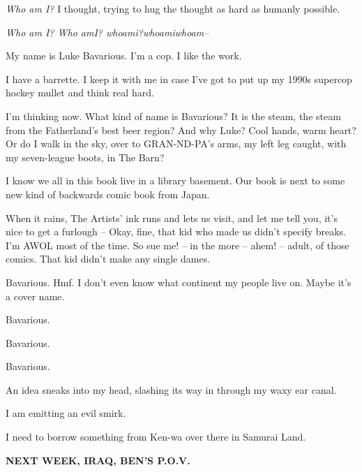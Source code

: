 {\em Who am I?} I thought, trying to hug the thought as hard as
humanly possible.



{\em Who am I? Who amI? whoami?whoamiwhoam--}





My name is Luke Bavarious. I'm a cop. I like the work.



I have a barrette. I keep it with me in case I've got to put up my
1990s supercop hockey mullet and think real hard.



I'm thinking now. What kind of name is Bavarious? It is the steam,
the steam from the Fatherland's best beer region? And why Luke?
Cool hands, warm heart? Or do I walk in the sky, over to
GRAN-ND-PA's arms, my left leg caught, with my seven-league boots,
in The Barn?



I know we all in this book live in a library basement. Our book is
next to some new kind of backwards comic book from Japan.



When it rains, The Artists' ink runs and lets us visit, and let me
tell you, it's nice to get a furlough -- Okay, fine, that kid who
made us didn't specify breaks. I'm AWOL most of the time. So sue
me! -- in the more -- ahem! -- adult, of those comics. That kid
didn't make any single dames.



Bavarious. Hmf. I don't even know what continent my people live on.
Maybe it's a cover name.



Bavarious.



Bavarious.



Bavarious.



An idea sneaks into my head, slashing its way in through my waxy
ear canal.



I am emitting an evil smirk.



I need to borrow something from Ken-wa over there in Samurai
Land.



{\bf NEXT WEEK, IRAQ, BEN'S P.O.V.}



